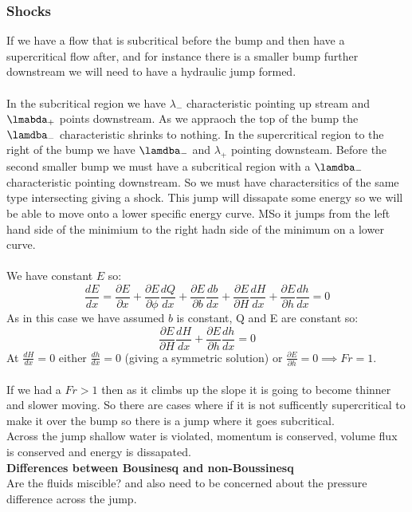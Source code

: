 \documentclass{article}
\begin{document}
\subsubsection{Shocks}
If we have a flow that is subcritical before the bump and then have a supercritical flow after, and for instance there is a smaller bump further downstream we will need to have a hydraulic jump formed.\\\\
In the subcritical region we have $\lambda_-$ characteristic pointing up stream and $\lmabda_+$ points downstream. As we appraoch the top of the bump the $\lamdba_-$ characteristic shrinks to nothing. In the supercritical region to the right of the bump we have $\lamdba_-$ and $\lambda_+$ pointing downsteam. Before the second smaller bump we must have a subcritical region with a $\lamdba_-$ characteristic pointing downstream. So we must have charactersitics of the same type intersecting giving a shock. This jump will dissapate some energy so we will be able to move onto a lower specific energy curve. MSo it jumps from the left hand side of the minimium to the right hadn side of the minimum on a lower curve.\\\\
We have constant $E$ so:
$$
 \frac{d E}{dx} = \frac{\partial E }{\partial x} + \frac{\partial E}{\partial \phi} \frac{d Q}{dx} + \frac{\partial E}{\partial b} \frac{d b}{dx} + \frac{\partial E}{\partial H} \frac{dH}{dx} + \frac{\partial E}{\partial h} \frac{dh }{dx} = 0
$$
As in this case we have assumed $b$ is constant, Q and E are constant so:
$$
 \frac{\partial E}{\partial H} \frac{d H}{dx} + \frac{\partial E}{\partial h} \frac{d h}{dx} = 0
$$
At $\frac{dH}{dx} = 0$ either $\frac{dh}{dx} = 0$ (giving a symmetric solution) or $\frac{\partial E}{\partial h} = 0 \implies Fr = 1$.\\\\
If we had a $Fr >1$ then as it climbs up the slope it is going to become thinner and slower moving. So there are cases where if it is not sufficently supercritical to make it over the bump so there is a jump where it goes subcritical. \\
Across the jump shallow water is violated, momentum is conserved, volume flux is conserved and energy is dissapated.\\
\textbf{Differences between Bousinesq and non-Boussinesq}\\
Are the fluids miscible? and also need to be concerned about the pressure difference across the jump.\\\\
\end{document}
